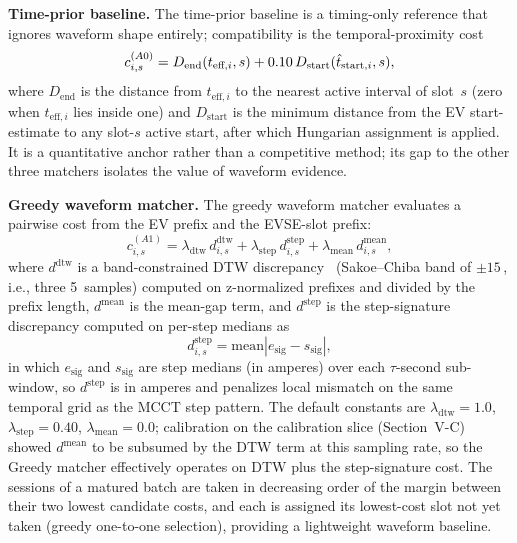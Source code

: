 \documentclass{ieeeaccess}
\newif\ifhighlight \highlightfalse
\DeclareRobustCommand{\revised}[1]{\ifhighlight{\color{blue}#1}\else{\color{.}#1}\fi}
\begin{document}
    \textbf{Time-prior baseline.}
    The time-prior baseline is a timing-only reference that ignores waveform shape entirely; compatibility is the temporal-proximity cost
    \begin{equation}\label{eq:a0}
        c^{(A0)}_{i,s} = D_{\text{end}}(t_{\text{eff},i}, s) + 0.10\,D_{\text{start}}(\revised{\hat{t}_{\text{start},i}}, s),
    \end{equation}
    where $D_{\text{end}}$ is the \revised{distance from $t_{\text{eff},i}$ to the nearest active interval of slot~$s$ (zero when $t_{\text{eff},i}$ lies inside one)} and $D_{\text{start}}$ is the minimum distance from the EV start-estimate to any slot-$s$ active start, after which Hungarian assignment is applied.
    It is a quantitative anchor rather than a competitive method; its gap to the other three matchers isolates the value of waveform evidence.

    \textbf{Greedy waveform matcher.}
    The greedy waveform matcher evaluates a pairwise cost from the EV prefix and the EVSE-slot prefix:
    \begin{equation}\label{eq:e6}
        c^{(A1)}_{i,s} = \lambda_{\text{dtw}}\,d^{\text{dtw}}_{i,s} + \lambda_{\text{step}}\,d^{\text{step}}_{i,s} + \lambda_{\text{mean}}\,d^{\text{mean}}_{i,s},
    \end{equation}
    where $d^{\text{dtw}}$ is a band-constrained DTW discrepancy~\cite{b16} \revised{(Sakoe--Chiba band of $\pm 15$\,, i.e., three 5\,\text{sec} samples)} computed on z-normalized prefixes and divided by the prefix length, $d^{\text{mean}}$ is the mean-gap term, and $d^{\text{step}}$ is the step-signature discrepancy computed on per-step medians as
    \begin{equation}\label{eq:e7}
        d^{\text{step}}_{i,s} = \text{mean}|e_{\text{sig}} - s_{\text{sig}}|,
    \end{equation}
    in which $e_{\text{sig}}$ and $s_{\text{sig}}$ are step medians (in amperes) over each $\tau$-second sub-window, so $d^{\text{step}}$ is in amperes and penalizes local mismatch on the same temporal grid as the MCCT step pattern.
    The default constants are $\lambda_{\text{dtw}} = 1.0$, $\lambda_{\text{step}} = 0.40$, $\lambda_{\text{mean}} = 0.0$; calibration on the calibration slice (Section~V-C) showed $d^{\text{mean}}$ to be subsumed by the DTW term at this sampling rate, so the Greedy matcher effectively operates on DTW plus the step-signature cost.
    \revised{The sessions of a matured batch are taken in decreasing order of the margin between their two lowest candidate costs, and each is assigned its lowest-cost slot not yet taken (greedy one-to-one selection)}, providing a lightweight waveform baseline.
\end{document}

